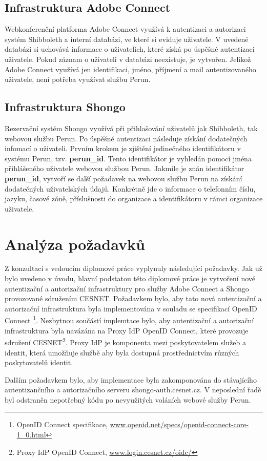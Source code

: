 \documentclass[
  printed, %
  twoside, %
  table,   %
  nolof,     %
  nolot,     %
]{fithesis3}
\begin{document}
\subsection{Infrastruktura Adobe Connect}
Webkonferenční platforma Adobe Connect využívá k autentizaci a autorizaci systém Shibboleth a interní databázi, ve které si eviduje uživatele. V uvedené databázi si uchovává informace o uživatelích, které získá po úspěšné autentizaci uživatele. Pokud záznam o uživateli v databázi neexistuje, je vytvořen. Jelikož Adobe Connect využívá jen identifikaci, jméno, příjmení a mail autentizovaného uživatele, není potřeba využívat službu Perun.  

\subsection{Infrastruktura Shongo}
Rezervační systém Shongo využívá při přihlašování uživatelů jak Shibboleth, tak webovou službu Perun. Po úspěšné autentizaci následuje získání dodatečných infomací o uživateli. Prvním krokem je zjištění jedinečného identifikátoru v systému Perun, tzv. \textbf{perun\_id}. Tento identifikátor je vyhledán pomocí jména přihlášeného uživatele webovou službou Perun. Jakmile je znán identifikátor \textbf{perun\_id}, vytvoří se další požadavek na webovou službu Perun na získání dodatečných uživatelských údajů. Konkrétně jde o informace o telefonním číslu, jazyku, časové zóně, příslušnosti do organizace a identifikátoru v rámci organizace uživatele.  

\section{Analýza požadavků}
Z konzultací s vedoucím diplomové práce vyplynuly následující požadavky. Jak už bylo uvedeno v úvodu, hlavní podstatou této diplomové práce je vytvoření nové autentizační a autorizační infrastruktury pro služby Adobe Connect a Shongo provozované sdružením CESNET. Požadavkem bylo, aby tato nová autentizační a autorizační infrastruktura byla implementována v souladu se specifikací OpenID Connect  \footnote{OpenID Connect specifikace, \url{www.openid.net/specs/openid-connect-core-1_0.html}}. Nezbytnou součástí implemtace bylo, aby autentizační a autorizační infrastruktura byla navázána na Proxy IdP OpenID Connect, které provozuje sdružení CESNET\footnote{Proxy IdP OpenID Connect, \url{www.login.cesnet.cz/oidc/}}. Proxy IdP je komponenta mezi poskytovatelem služeb a identit, která umožňuje službě aby byla dostupná prostřednictvím různých poskytovatelů identit.  \par
Dalším požadavkem bylo, aby implementace byla zakomponována do stávajícího autentizančního a autorizačního serveru shongo-auth.cesnet.cz. V neposlední řadě byl odstraněn nepotřebný kódu po nevyužitých voláních webové služby Perun.   
\end{document}
